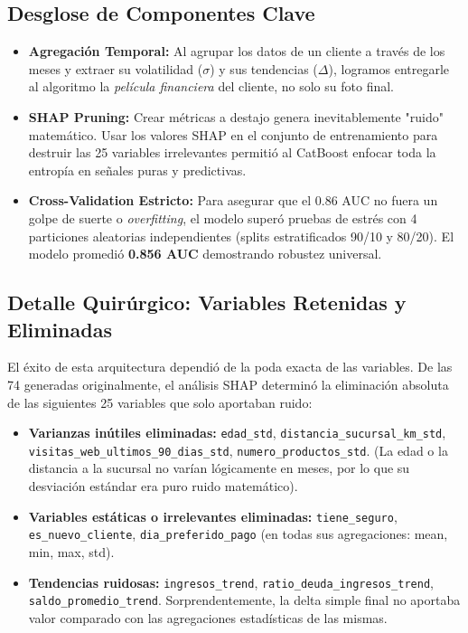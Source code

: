 \documentclass[a4paper,11pt]{article}
\begin{document}
\subsection{Desglose de Componentes Clave}
\begin{itemize}
    \item \textbf{Agregación Temporal:} Al agrupar los datos de un cliente a través de los meses y extraer su volatilidad ($\sigma$) y sus tendencias ($\Delta$), logramos entregarle al algoritmo la \textit{película financiera} del cliente, no solo su foto final.
    \item \textbf{SHAP Pruning:} Crear métricas a destajo genera inevitablemente "ruido" matemático. Usar los valores SHAP en el conjunto de entrenamiento para destruir las 25 variables irrelevantes permitió al CatBoost enfocar toda la entropía en señales puras y predictivas.
    \item \textbf{Cross-Validation Estricto:} Para asegurar que el 0.86 AUC no fuera un golpe de suerte o \textit{overfitting}, el modelo superó pruebas de estrés con 4 particiones aleatorias independientes (splits estratificados 90/10 y 80/20). El modelo promedió \textbf{0.856 AUC} demostrando robustez universal.
\end{itemize}

\subsection{Detalle Quirúrgico: Variables Retenidas y Eliminadas}
El éxito de esta arquitectura dependió de la poda exacta de las variables. De las 74 generadas originalmente, el análisis SHAP determinó la eliminación absoluta de las siguientes 25 variables que solo aportaban ruido:
\begin{itemize}
    \item \textbf{Varianzas inútiles eliminadas:} \texttt{edad\_std}, \texttt{distancia\_sucursal\_km\_std}, \texttt{visitas\_web\_ultimos\_90\_dias\_std}, \texttt{numero\_productos\_std}. (La edad o la distancia a la sucursal no varían lógicamente en meses, por lo que su desviación estándar era puro ruido matemático).
    \item \textbf{Variables estáticas o irrelevantes eliminadas:} \texttt{tiene\_seguro}, \texttt{es\_nuevo\_cliente}, \texttt{dia\_preferido\_pago} (en todas sus agregaciones: mean, min, max, std).
    \item \textbf{Tendencias ruidosas:} \texttt{ingresos\_trend}, \texttt{ratio\_deuda\_ingresos\_trend}, \texttt{saldo\_promedio\_trend}. Sorprendentemente, la delta simple final no aportaba valor comparado con las agregaciones estadísticas de las mismas.
\end{itemize}
\end{document}
